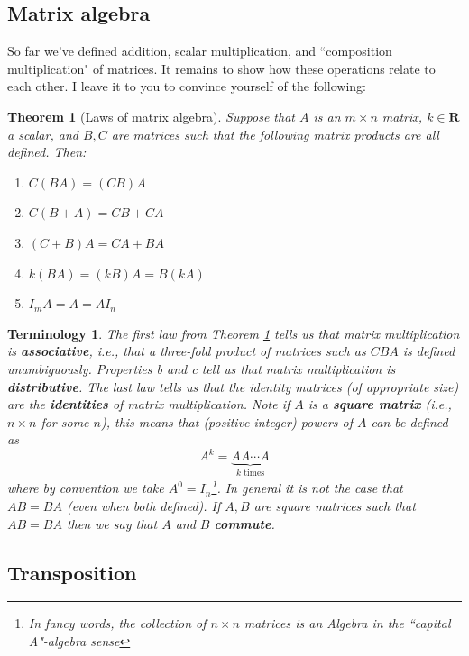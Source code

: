 \documentclass[12pt]{article}
\numberwithin{equation}{subsection}
\numberwithin{figure}{subsection}
\newtheorem{thm}[subsection]{Theorem}
\theoremstyle{note}
\newtheorem{terminology}[subsection]{Terminology}
\begin{document}
\subsection{Matrix algebra}		
	So far we've defined addition, scalar multiplication, and ``composition multiplication" of matrices. It remains to show how these operations relate to each other. I leave it to you to convince yourself of the following: 
	\begin{thm}[Laws of matrix algebra] \label{thm-mat-alg}
	Suppose that $A$ is an $m\times n$ matrix, $k\in\mathbf{R}$ a scalar, and $B,C$ are matrices such that the following matrix products are all defined. Then:
	\begin{enumerate}
		\item $C(BA)=(CB)A$ 
		\item $C(B+A)=CB+CA$
		\item $(C+B)A=CA+BA$
		\item $k(BA)=(kB)A=B(kA)$
		\item $I_mA=A=AI_n$
	\end{enumerate}
	\end{thm}
	\begin{terminology} The first law from Theorem \ref{thm-mat-alg} tells us that matrix multiplication is \textbf{associative}, i.e., that a three-fold product of matrices such as  $CBA$ is defined unambiguously. Properties b and c tell us that matrix multiplication is \textbf{distributive}. The last law tells us that the identity matrices (of appropriate size) are the \textbf{identities} of matrix multiplication. Note if $A$ is a \textbf{square matrix} (i.e., $n\times n$ for some $n$), this means that (positive integer) powers of $A$ can be defined as \begin{equation} A^k=\underbrace{AA\cdots A}_{\text{$k$ times}}\end{equation} where by convention we take $A^0=I_n$\footnote{In fancy words, the collection of $n\times n$ matrices is an \textit{Algebra} in the ``capital A"-algebra sense}. In general it is not the case that $AB=BA$ (even when both defined). If $A,B$ are square matrices such that $AB=BA$ then we say that $A$ and $B$ \textbf{commute}.
	\end{terminology}
\subsection{Transposition}
\end{document}
